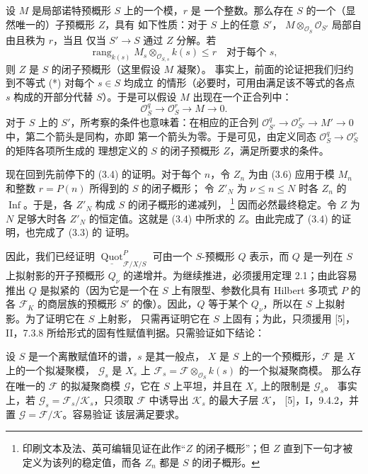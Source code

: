  设 $M$ 是局部诺特预概形 $S$ 上的一个模，$r$ 是
一个整数。那么存在 $S$ 的一个（显然唯一的）子预概形 $Z$，具有
如下性质：对于 $S$ 上的任意 $S'$，
$M\otimes_{\mathcal O_S}\mathcal O_{S'}$ 局部自由且秩为 $r$，当且
仅当 $S'\longrightarrow S$ 通过 $Z$ 分解。若
\[
\operatorname{rang}_{k(s)}
M_s\otimes_{\mathcal O_{S,s}}k(s)\leq r
\quad\text{对于每个 $s$},
\]
则 $Z$ 是 $S$ 的闭子预概形（这里假设 $M$ 凝聚）。
事实上，前面的论证把我们归约到不等式 (*) 对每个 $s\in S$ 均成立
的情形（必要时，可用由满足该不等式的各点 $s$ 构成的开部分代替
$S$）。于是可以假设 $M$ 出现在一个正合列中：
\[
\mathcal O_S^q\longrightarrow\mathcal O_S^r\longrightarrow M\longrightarrow0.
\]
对于 $S$ 上的 $S'$，所考察的条件也意味着：在相应的正合列
$\mathcal O_{S'}^q\longrightarrow\mathcal O_{S'}^r
\longrightarrow M'\longrightarrow0$ 中，第二个箭头是同构，亦即
第一个箭头为零。于是可见，由定义同态
$\mathcal O_S^q\longrightarrow\mathcal O_S^r$ 的矩阵各项所生成的
理想定义的 $S$ 的闭子预概形 $Z$，满足所要求的条件。

现在回到先前停下的 (3.4) 的证明。对于每个 $n$，令 $Z_n$ 为由
(3.6) 应用于模 $M_n$ 和整数 $r=P(n)$ 所得到的 $S$ 的闭子概形；
令 $Z'_N$ 为 $\nu\leq n\leq N$ 时各 $Z_n$ 的
$\operatorname{Inf}$。于是，各 $Z'_N$ 构成 $S$ 的闭子概形的递减列，
\footnote{印刷文本及法、英可编辑见证在此作“$Z$ 的闭子概形”；但
$Z$ 直到下一句才被定义为该列的稳定值，而各 $Z_n$ 都是 $S$ 的闭子概形。}
因而必然最终稳定。令 $Z$ 为 $N$ 足够大时各 $Z'_N$ 的恒定值。这就是
(3.4) 中所求的 $Z$。由此完成了 (3.4) 的证明，也完成了 (3.3) 的
证明。

因此，我们已经证明
$\underline{\operatorname{Quot}}^P_{\mathcal F/X/S}$ 可由一个
$S$-预概形 $Q$ 表示，而 $Q$ 是一列在 $S$ 上拟射影的开子预概形
$Q_\nu$ 的递增并。为继续推进，必须援用定理 2.1；由此容易推出 $Q$
是拟紧的（因为它是一个在 $S$ 上有限型、参数化具有 Hilbert 多项式
$P$ 的各 $\mathcal F_K$ 的商层族的预概形 $S'$ 的像）。因此，$Q$
等于某个 $Q_\nu$，所以在 $S$ 上拟射影。为了证明它在 $S$ 上射影，
只需再证明它在 $S$ 上固有；为此，只须援用 [5]，II，7.3.8
所给形式的固有性赋值判据。只需验证如下结论：

 设 $S$ 是一个离散赋值环的谱，$s$ 是其一般点，
$X$ 是 $S$ 上的一个预概形，$\mathcal F$ 是 $X$ 上的一个拟凝聚模，
$\mathcal G_s$ 是 $X_s$ 上
$\mathcal F_s=\mathcal F\otimes_{\mathcal O_S}k(s)$ 的一个拟凝聚商模。
那么存在唯一的 $\mathcal F$ 的拟凝聚商模 $\mathcal G$，它在 $S$
上平坦，并且在 $X_s$ 上的限制是 $\mathcal G_s$。
事实上，若 $\mathcal G_s=\mathcal F_s/\mathcal K_s$，只须取
$\mathcal F$ 中诱导出 $\mathcal K_s$ 的最大子层 $\mathcal K$，
[5]，I，9.4.2，并置 $\mathcal G=\mathcal F/\mathcal K$。容易验证
该层满足要求。

